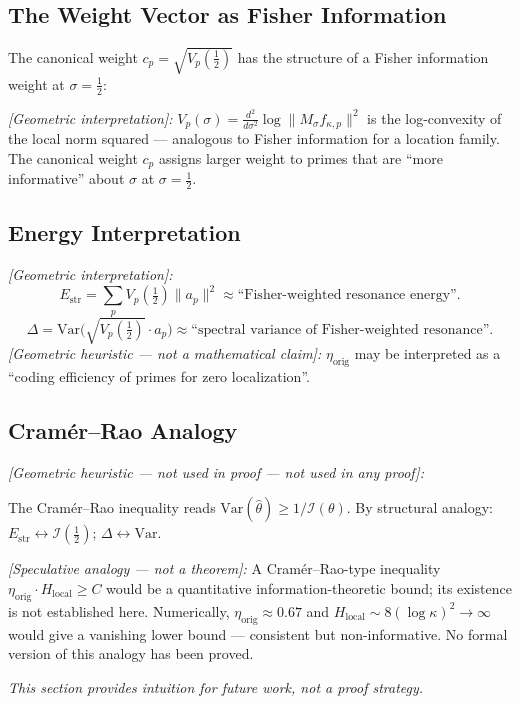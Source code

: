 \documentclass[11pt]{article}
\newcommand{\Estr}{E_{\mathrm{str}}}
\newcommand{\etaorig}{\eta_{\mathrm{orig}}}
\begin{document}
\subsection{The Weight Vector as Fisher Information}

The canonical weight $c_p = \sqrt{V_p(\tfrac{1}{2})}$ has the structure
of a Fisher information weight at $\sigma=\tfrac{1}{2}$:

\emph{[Geometric interpretation]:}
$V_p(\sigma) = \tfrac{d^2}{d\sigma^2}\log\|M_\sigma f_{\kappa,p}\|^2$
is the log-convexity of the local norm squared ---
analogous to Fisher information for a location family.
The canonical weight $c_p$ assigns larger weight to primes that are
``more informative'' about $\sigma$ at $\sigma=\tfrac{1}{2}$.

\subsection{Energy Interpretation}

\emph{[Geometric interpretation]:}
\[
\Estr = \sum_p V_p(\tfrac{1}{2})\|a_p\|^2
\approx \text{``Fisher-weighted resonance energy''}.
\]
\[
\Delta = \mathrm{Var}\bigl(\sqrt{V_p(\tfrac{1}{2})}\cdot a_p\bigr)
\approx \text{``spectral variance of Fisher-weighted resonance''}.
\]
\emph{[Geometric heuristic --- not a mathematical claim]:}
$\etaorig$ may be interpreted as a ``coding efficiency of primes
for zero localization''.

\subsection{Cram\'er--Rao Analogy}

\emph{[Geometric heuristic --- not used in proof --- not used in any proof]:}

The Cram\'er--Rao inequality reads
$\mathrm{Var}(\hat\theta)\geq 1/\mathcal{I}(\theta)$.
By structural analogy:
$\Estr\longleftrightarrow\mathcal{I}(\tfrac{1}{2})$;
$\Delta\longleftrightarrow\mathrm{Var}$.

\emph{[Speculative analogy --- not a theorem]:}
A Cram\'er--Rao-type inequality
$\etaorig\cdot H_{\mathrm{local}}\geq C$ would be a quantitative
information-theoretic bound; its existence is not established here.
Numerically, $\etaorig\approx 0.67$ and
$H_{\mathrm{local}}\sim 8(\log\kappa)^2\to\infty$ would give a
vanishing lower bound --- consistent but non-informative.
No formal version of this analogy has been proved.

\emph{This section provides intuition for future work, not a proof strategy.}
\end{document}
